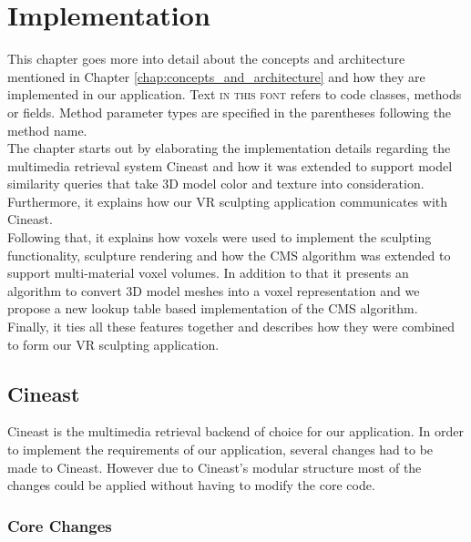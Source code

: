 \chapter{Implementation}

This chapter goes more into detail about the concepts and architecture mentioned in Chapter \ref{chap:concepts_and_architecture} and how they
are implemented in our application. Text \textsc{in this font} refers to code classes, methods or fields. Method parameter types are specified in the parentheses following the method name.\\
The chapter starts out by elaborating the implementation details regarding the multimedia retrieval system Cineast and how it was extended to support model similarity queries that take 3D model color and texture into consideration. Furthermore, it explains how our VR sculpting application communicates with Cineast.\\
Following that, it explains how voxels were used to implement the sculpting functionality, sculpture rendering and how the CMS algorithm was extended to support multi-material voxel volumes. In addition to that it presents an algorithm to
convert 3D model meshes into a voxel representation and we propose a new lookup table based implementation of the CMS algorithm.\\
Finally, it ties all these features together and describes how they were combined to form our VR sculpting application.

\section{Cineast}

Cineast is the multimedia retrieval backend of choice for our application. In order to implement the requirements of our application,
several changes had to be made to Cineast. However due to Cineast's modular structure most of the changes could be applied without having to
modify the core code.


\subsection{Core Changes}
\label{sec:core_changes}

